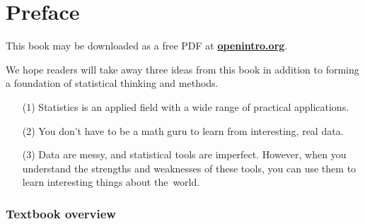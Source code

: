 \chapter*{Preface}



This book may be downloaded as a free PDF at \href{http://www.openintro.org}{\color{black}\textbf{openintro.org}}. %
\vspace{3mm}

\noindent We hope readers will take away three ideas from this book in addition to forming a foundation of statistical thinking and methods.\vspace{-1mm}
\begin{enumerate}
\setlength{\itemsep}{0mm}
\item[(1)] Statistics is an applied field with a wide range of practical applications.
\item[(2)] You don't have to be a math guru to learn from interesting, real data.
\item[(3)] Data are messy, and statistical tools are imperfect. However, when you understand the strengths and weaknesses of these tools, you can use them to learn interesting things about the~world.
\end{enumerate}


\subsection*{Textbook overview}

